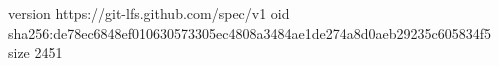 version https://git-lfs.github.com/spec/v1
oid sha256:de78ec6848ef010630573305ec4808a3484ae1de274a8d0aeb29235c605834f5
size 2451
